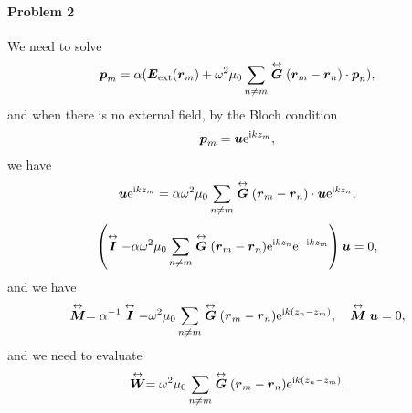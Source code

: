 \documentclass[hyperref, a4paper]{article}
\newcommand*{\ii}{\mathrm{i}}
\newcommand*{\ee}{\mathrm{e}}
\renewcommand{\tensor}[1]{ \stackrel{\leftrightarrow}{\vb*{#1}}}
\begin{document}
\paragraph{}

\paragraph{Problem 2} We need to solve 
\begin{equation}
    \vb*{p}_m = \alpha (\vb*{E}_\text{ext}(\vb*{r}_m) + \omega^2 \mu_0 \sum_{n \neq m} \tensor{\vb*{G}}(\vb*{r}_m - \vb*{r}_n) \cdot \vb*{p}_n),
    \label{eq:p-ext}
\end{equation}
and when there is no external field, by the Bloch condition 
\begin{equation}
    \vb*{p}_m = \vb*{u} \ee^{\ii k z_m},
\end{equation}
we have 
\[
    \vb*{u} \ee^{\ii k z_m} = \alpha \omega^2 \mu_0 \sum_{n \neq m} \tensor{\vb*{G}}(\vb*{r}_m - \vb*{r}_n) \cdot \vb*{u} \ee^{\ii k z_n},
\]
\[
    \left( \tensor{\vb*{I}} - \alpha \omega^2 \mu_0 \sum_{n \neq m} \tensor{\vb*{G}}(\vb*{r}_m - \vb*{r}_n) \ee^{\ii k z_n} \ee^{- \ii k z_m}  \right) \vb*{u}  = 0,
\]
and we have 
\begin{equation}
    \tensor{\vb*{M}} = \alpha^{-1} \tensor{ \vb*{I}} - \omega^2 \mu_0 \sum_{n \neq m} \tensor{\vb*{G}}(\vb*{r}_m - \vb*{r}_n) \ee^{\ii k (z_n - z_m)}, \quad \tensor{\vb*{M}} \vb*{u} = 0,
    \label{eq:eigen-problem}
\end{equation}
and we need to evaluate 
\begin{equation}
    \tensor{\vb*{W}} = \omega^2 \mu_0 \sum_{n \neq m} \tensor{\vb*{G}}(\vb*{r}_m - \vb*{r}_n) \ee^{\ii k (z_n - z_m)}.
    \label{eq:def-w}
\end{equation}
\end{document}
